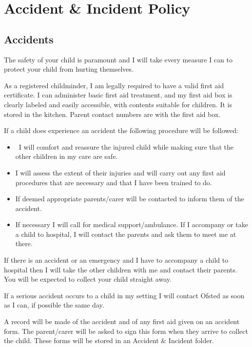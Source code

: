 \documentclass[10pt]{article}
\begin{document}
\section{Accident \& Incident Policy}

\subsection{Accidents}

The safety of your child is paramount and I will take every measure I
can to protect your child from hurting themselves.

As a registered childminder, I am legally required to have a valid first
aid certificate. I can administer basic first aid treatment, and my
first aid box is clearly labeled and easily accessible, with contents
suitable for children. It is stored in the kitchen. Parent contact
numbers are with the first aid box.

If a child does experience an accident the following procedure will be
followed:

\begin{itemize}
\item
  ~I will comfort and reassure the injured child while making sure that
  the other children in my care are safe.~
\item
  I will assess the extent of their injuries and will carry out any
  first aid procedures that are necessary and that I have been trained
  to do.~
\item
  If deemed appropriate parents/carer will be contacted to inform them
  of the accident.~
\item
  If necessary I will call for medical support/ambulance. If I
  accompany or take a child to hospital, I will contact the parents and
  ask them to meet me at there.~
\end{itemize}

If there is an accident or an emergency and I have to accompany a child
to hospital then I will take the other children with me and contact
their parents. You will be expected to collect your child straight away.

If a serious accident occurs to a child in my setting I will contact
Ofsted as soon as I can, if possible the same day.

A record will be made of the accident and of any first aid given on an
accident form. The parent/carer will be asked to sign this form when
they arrive to collect the child. These forms will be stored in an
Accident \& Incident folder.
\end{document}
